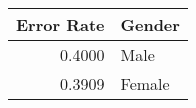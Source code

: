 
\begin{tabular}{r|l}
\hline
Error Rate & Gender\\
\hline
0.4000 & Male\\
\hline
0.3909 & Female\\
\hline
\end{tabular}
